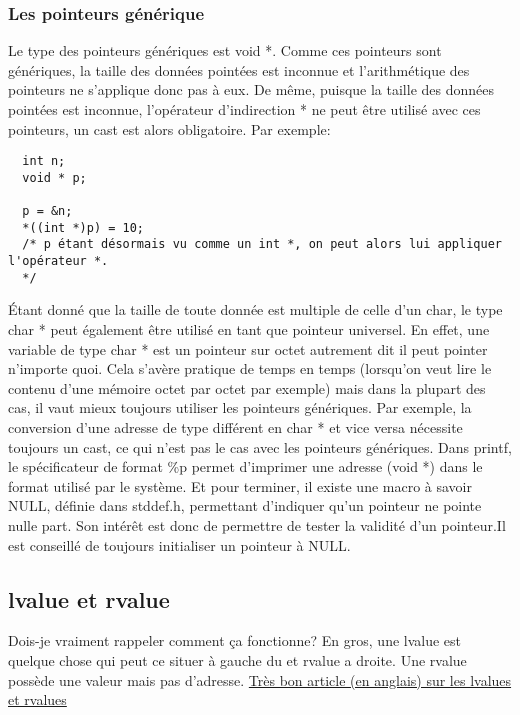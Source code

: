 \documentclass[a4paper]{article}
\begin{document}
\subsubsection{Les pointeurs générique}
 Le type des pointeurs génériques est void *. Comme ces pointeurs sont génériques, la taille des données pointées est inconnue et l'arithmétique des pointeurs ne s'applique donc pas à eux. De même, puisque la taille des données pointées est inconnue, l'opérateur d'indirection * ne peut être utilisé avec ces pointeurs, un cast est alors obligatoire. Par exemple:
\begin{lstlisting}
  int n;
  void * p;

  p = &n;
  *((int *)p) = 10;
  /* p étant désormais vu comme un int *, on peut alors lui appliquer l'opérateur *.
  */
\end{lstlisting}
Étant donné que la taille de toute donnée est multiple de celle d'un char, le type char * peut également être utilisé en tant que pointeur universel. En effet, une variable de type char * est un pointeur sur octet autrement dit il peut pointer n'importe quoi. Cela s'avère pratique de temps en temps (lorsqu'on veut lire le contenu d'une mémoire octet par octet par exemple) mais dans la plupart des cas, il vaut mieux toujours utiliser les pointeurs génériques. Par exemple, la conversion d'une adresse de type différent en char * et vice versa nécessite toujours un cast, ce qui n'est pas le cas avec les pointeurs génériques.\newline
Dans printf, le spécificateur de format \%p permet d'imprimer une adresse (void *) dans le format utilisé par le système.\newline
Et pour terminer, il existe une macro à savoir NULL, définie dans stddef.h, permettant d'indiquer qu'un pointeur ne pointe nulle part. Son intérêt est donc de permettre de tester la validité d'un pointeur.Il est conseillé de toujours initialiser un pointeur à NULL.

\subsection{lvalue et rvalue}
Dois-je vraiment rappeler comment ça fonctionne?
En gros, une lvalue est quelque chose qui peut ce situer à gauche du \guillemotleft{=}\guillemotright{} et rvalue a droite. Une rvalue possède une valeur mais pas d'adresse.
\href{https://www.internalpointers.com/post/understanding-meaning-lvalues-and-rvalues-c}{Très bon article (en anglais) sur les lvalues et rvalues}
\end{document}
